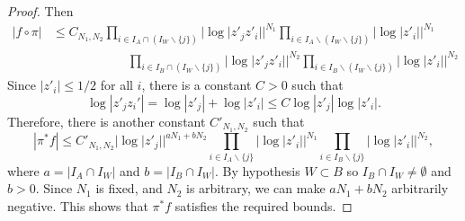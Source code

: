 \documentclass[11pt,a4paper]{amsart}
\numberwithin{equation}{section}
\theoremstyle{plain}
\theoremstyle{definition}
\begin{document}
\begin{proof}
  Then 
  \begin{align*}
    \left | f\circ \pi 
    \right|&\le C_{N_1,N_2}
    \prod_{i\in I_A\cap (I_{W}\smallsetminus \{j\})}|\log|z'_{j}z'_i||^{N_1}
     \prod_{i\in I_A\smallsetminus (I_{W}\smallsetminus \{j\})}|\log|z'_i||^{N_1}\\
    &\qquad \qquad \qquad \prod_{i\in I_B\cap (I_{W}\smallsetminus \{j\})}|\log|z'_{j}z'_i||^{N_2}
     \prod_{i\in I_B\smallsetminus (I_{W}\smallsetminus \{j\})}|\log|z'_i||^{N_2}
  \end{align*}
  Since $|z'_{i}|\le 1/2$ for all $i$, there is a constant $C>0$ such
  that
  \begin{displaymath}
    \log|z'_{j}z_i'|=\log|z'_{j}|+\log|z'_i|\le C\log|z'_{j}|\log|z'_i|. 
  \end{displaymath}
  Therefore, there is another constant $C'_{N_{1},N_{2}}$ such that 
  \begin{equation}\label{eq:20}
    \left | \pi ^{\ast }f 
    \right|\le C'_{N_1,N_2} |\log|z'_j||^{aN_{1}+bN_2}
    \prod_{i\in I_A\smallsetminus \{j\}}|\log|z'_i||^{N_1}
   \prod_{i\in I_{B}\smallsetminus \{j\}}|\log|z'_i||^{N_2},
 \end{equation}
 where $a=|I_{A}\cap I_{W}|$ and $b=|I_{B}\cap I_{W}|$. By hypothesis
 $W\subset B$ so $I_{B}\cap I_{W}\not = \emptyset $ and $b>0$. Since
 $N_{1}$ is fixed, and $N_{2}$ is arbitrary, we can make
 $aN_{1}+bN_{2}$ arbitrarily negative. This shows that   $\pi
 ^{\ast}f$ satisfies the required bounds.


\end{proof}
\end{document}
